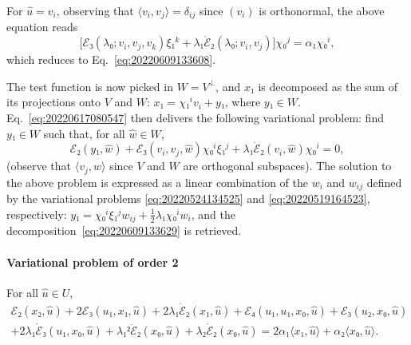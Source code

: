 \documentclass[12pt, final]{scrartcl}
\theoremstyle{definition}
\begin{document}
For \(\hat{u} = v_i\), observing that \(〈 v_i, v_j 〉 = δ_{ij}\) since
\((v_i)\) is orthonormal, the above equation reads
\begin{equation}
  \bigl[ℰ₃(λ₀; v_i, v_j, v_k) ξ₁^k + λ₁ \dot{ℰ}₂(λ₀; v_i, v_j)\bigr] χ₀^j = α₁ χ₀^i,
\end{equation}
which reduces to Eq.~\eqref{eq:20220609133608}.

The test function is now picked in \(W = V^\perp\), and \(x₁\) is decomposed as
the sum of its projections onto \(V\) and \(W\): \(x₁ = χ₁^i v_i + y₁\), where
\(y₁ ∈ W\). Eq.~\eqref{eq:20220617080547} then delivers the following
variational problem: find \(y₁ ∈ W\) such that, for all \(\hat{w} ∈ W\),
\begin{equation}
  ℰ₂(y₁, \hat{w}) + ℰ₃(v_i, v_j, \hat{w}) χ₀^i ξ₁^j + λ₁ \dot{ℰ}₂(v_i, \hat{w}) χ₀^i = 0,
\end{equation}
(observe that \(〈 v_j, \hat{w} 〉\) since \(V\) and \(W\) are orthogonal
subspaces). The solution to the above problem is expressed as a linear
combination of the \(w_i\) and \(w_{ij}\) defined by the variational problems
\eqref{eq:20220524134525} and \eqref{eq:20220519164523}, respectively:
\(y₁ = χ₀^i ξ₁^j w_{i j} + \tfrac{1}{2} λ₁ χ₀^i w_i\), and the
decomposition~\eqref{eq:20220609133629} is retrieved.

\paragraph{Variational problem of order 2} For all \(\hat{u} ∈ U\),
\begin{multline*}
  ℰ₂(x₂, \hat{u}) + 2ℰ₃(u₁, x₁, \hat{u}) + 2 λ₁ \dot{ℰ}₂(x₁, \hat{u}) + ℰ₄(u₁, u₁, x₀, \hat{u}) + ℰ₃(u₂, x₀, \hat{u})\\
  + 2λ₁ \dot{ℰ}₃(u₁, x₀, \hat{u}) + λ₁² \ddot{ℰ}₂(x₀, \hat{u}) + λ₂ \dot{ℰ}₂(x₀, \hat{u}) = 2 α₁ 〈 x₁, \hat{u} 〉 + α₂ 〈 x₀, \hat{u} 〉.
\end{multline*}
\end{document}
